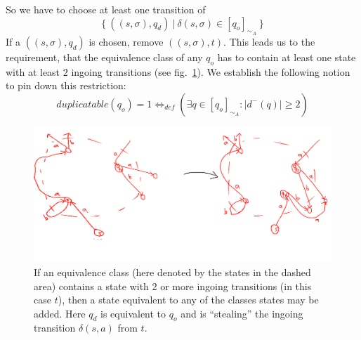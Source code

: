 So we have to choose at least one transition of
\[
	\{\ ((s, \sigma), q_d)\ |\ \delta(s,\sigma) \in [q_o]_{\sim_A}\ \}
\]
If a $((s, \sigma), q_d)$ is chosen, remove $((s, \sigma), t)$. This leads us to the requirement, that the equivalence class of any $q_o$ has to contain at least one state with at least $2$ ingoing transitions (see fig.~\ref{fig:dfa_add_redundant_states}). We establish the following notion to pin down this restriction:
\[
	duplicatable(q_o) = 1 \Leftrightarrow_{def} (\exists q \in [q_o]_{\sim_A}\colon |d^-(q)| \geq 2)
\]
\begin{figure}
	\includegraphics[width=\linewidth]{images/dfa_add_redundant_states.png}
	\caption{If an equivalence class (here denoted by the states in the dashed area) contains a state with 2 or more ingoing transitions (in this case $t$), then a state equivalent to any of the classes states may be added. Here $q_d$ is equivalent to $q_o$ and is ``stealing'' the ingoing transition $\delta(s, a)$ from $t$.}
	\label{fig:dfa_add_redundant_states}
\end{figure}

